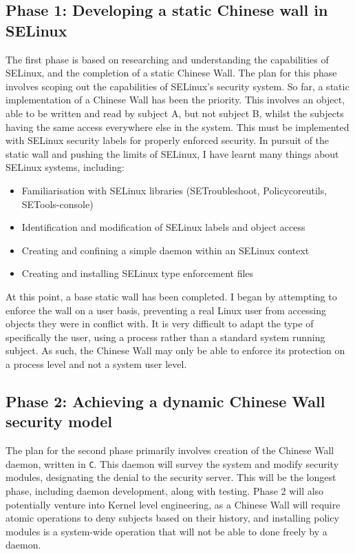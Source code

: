 \documentclass[11pt,titlepage,dvipsnames,table,xcdraw]{article}
\begin{document}
\subsection{Phase 1: Developing a static Chinese wall in SELinux}
The first phase is based on researching and understanding the capabilities of SELinux, and the completion of a static Chinese Wall. The plan for this phase involves scoping out the capabilities of SELinux's security
system. So far, a static implementation of a Chinese Wall has been the priority. This involves an object, able to be written and read by subject A, but not subject B, whilst the subjects having the same access 
everywhere else in the system. This must be implemented with SELinux security
labels for properly enforced security. In pursuit of the static wall and pushing the limits of SELinux, I have learnt many things about SELinux systems, including:
\begin{itemize}
  \item Familiarisation with SELinux libraries (SETroubleshoot, Policycoreutils, SETools-console)
  \item Identification and modification of SELinux labels and object access
  \item Creating and confining a simple daemon within an SELinux context 
  \item Creating and installing SELinux type enforcement files
\end{itemize}

At this point, a base static wall has been completed. I began by attempting to enforce the wall on a user basis, preventing a real Linux user from accessing objects they were in conflict with.
It is very difficult to adapt the type of specifically the user, using a process rather than a standard system running subject. As such, the Chinese Wall may only be able to enforce
its protection on a process level and not a system user level.

\subsection{Phase 2: Achieving a dynamic Chinese Wall security model}
The plan for the second phase primarily involves creation of the Chinese Wall daemon, written in \verb_C_. This daemon will survey the system and modify security modules, designating the denial to the security server.
This will be the longest phase, including daemon development, along with testing. Phase 2 will also potentially venture into Kernel level engineering, as a Chinese Wall will require atomic operations to deny subjects
based on their history, and installing policy modules is a system-wide operation that will not be able to done freely by a daemon.
\end{document}
